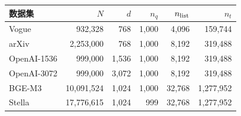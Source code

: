 \begin{tabular*}{\linewidth}{@{\extracolsep{\fill}}lrrrrr@{}}
\toprule
数据集 & $N$ & $d$ & $n_q$ & $n_{\rm list}$ & $n_t$ \\
\midrule
Vogue & 932,328 & 768 & 1,000 & 4,096 & 159,744 \\
arXiv & 2,253,000 & 768 & 1,000 & 8,192 & 319,488 \\
OpenAI-1536 & 999,000 & 1,536 & 1,000 & 8,192 & 319,488 \\
OpenAI-3072 & 999,000 & 3,072 & 1,000 & 8,192 & 319,488 \\
BGE-M3 & 10,091,524 & 1,024 & 1,000 & 32,768 & 1,277,952 \\
Stella & 17,776,615 & 1,024 & 999 & 32,768 & 1,277,952 \\
\bottomrule
\end{tabular*}
